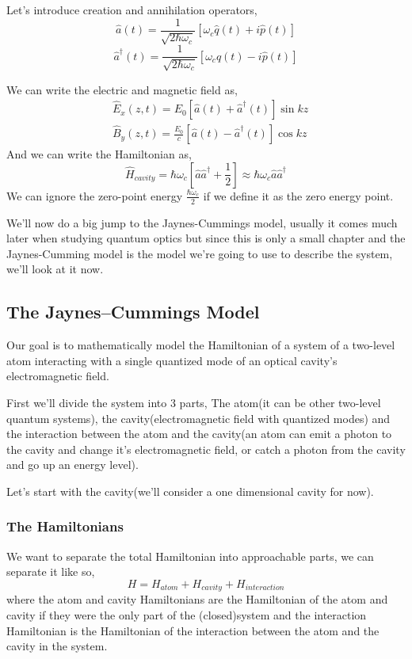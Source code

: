 \documentclass[english, a4paper, 12pt, twoside]{article}
\numberwithin{equation}{section} %
\begin{document}
Let’s introduce creation and annihilation operators,
$$\hat{a}(t) = \frac{1}{\sqrt{2\hbar\omega_c}}[\omega_c\hat{q}(t) + i\hat{p}(t)]$$
$$\hat{a}^\dag(t) = \frac{1}{\sqrt{2\hbar\omega_c}}[\omega_c\hat{q}(t) - i\hat{p}(t)]$$

We can write the electric and magnetic field as,
\begin{align}
         &\hat{E}_x(   z, t) = E_0[\hat{a}(t) + \hat{a}^\dag(t)]\sin{kz} \\
         &\hat{B}_y(z, t) = \frac{E_0}{c}[\hat{a}(t) - \hat{a}^\dag(t)]\cos{kz}
\end{align}
And we can write the Hamiltonian as,
\begin{equation}\label{eq:cavity_hamiltonian}
    \hat{H}_{cavity} = \hbar\omega_c[\hat{a}\hat{a}^\dag + \frac{1}{2}] \approx \hbar\omega_c\hat{a}\hat{a}^\dag
\end{equation}
We can ignore the zero-point energy $\frac{\hbar\omega_c}{2}$ if we define it as the zero energy point.

We'll now do a big jump to the Jaynes-Cummings model, usually it comes much later when studying quantum optics but since this is only a small chapter and the Jaynes-Cumming model is the model we're going to use to describe the system, we'll look at it now.
\subsection{The Jaynes–Cummings Model}
Our goal is to mathematically model the Hamiltonian of a system of a two-level atom interacting with a single quantized mode of an optical cavity's electromagnetic field. %
\par
First we'll divide the system into 3 parts, The atom(it can be other two-level quantum systems), the cavity(electromagnetic field with quantized modes) and the interaction between the atom and the cavity(an atom can emit a photon to the cavity and change it's electromagnetic field, or catch a photon from the cavity and go up an energy level).\par  %

Let's start with the cavity(we'll consider a one dimensional cavity for now).
\subsubsection{The Hamiltonians}
We want to separate the total Hamiltonian into approachable parts, we can separate it like so,
\[
    H = H_{atom} + H_{cavity} + H_{interaction}
\]
where the atom and cavity Hamiltonians are the Hamiltonian of the atom and cavity if they were the only part of the (closed)system and the interaction Hamiltonian is the Hamiltonian of the interaction between the atom and the cavity in the system.
\end{document}
